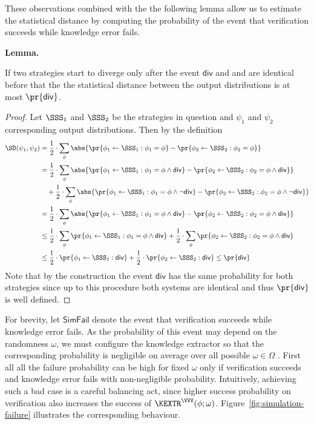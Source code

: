 \documentclass{crypto-exercise}
\newcommand{\SFAIL}{\mathsf{SimFail}}
\begin{document}
\begin{solution}
These observations combined with the the following lemma allow us to estimate the statistical distance by computing the probability of the event that verification succeeds while knowledge error fails. 
 
\vspace*{2ex}
\noindent\textbf{Lemma.}
\begin{it}
If two strategies start to diverge only after the event $\mathsf{div}$ and and are identical before that the the statistical distance between the output distributions is at most $\pr{\mathsf{div}}$.  
\end{it} 
\begin{proof}
Let $\SSS_1$ and $\SSS_2$ be the strategies in question and $\psi_1$ and $\psi_2$ corresponding output distributions. Then by the definition
\begin{align*}
\SD(\psi_1,\psi_2)&=\frac{1}{2}\cdot \sum_{\phi}\abs{\pr{\phi_1\gets\SSS_1: \phi_1=\phi}-\pr{\phi_2\gets\SSS_2: \phi_2=\phi }}\\
&=\frac{1}{2}\cdot \sum_{\phi}\abs{\pr{\phi_1\gets\SSS_1: \phi_1=\phi\wedge \mathsf{div}}-\pr{\phi_2\gets\SSS_2: \phi_2=\phi\wedge \mathsf{div}}}\\
&\quad+\frac{1}{2}\cdot \sum_{\phi}\abs{\pr{\phi_1\gets\SSS_1: \phi_1=\phi\wedge \neg\mathsf{div}}-\pr{\phi_2\gets\SSS_2: \phi_2=\phi\wedge \neg\mathsf{div}}}\\
&=\frac{1}{2}\cdot \sum_{\phi}\abs{\pr{\phi_1\gets\SSS_1: \phi_1=\phi\wedge \mathsf{div}}-\pr{\phi_2\gets\SSS_2: \phi_2=\phi\wedge \mathsf{div}}}\\
&\leq \frac{1}{2}\cdot \sum_{\phi}\pr{\phi_1\gets\SSS_1: \phi_1=\phi\wedge \mathsf{div}}+ \frac{1}{2}\cdot \sum_{\phi}\pr{\phi_2\gets\SSS_2: \phi_2=\phi\wedge \mathsf{div}}\\
&\leq \frac{1}{2}\cdot \pr{\phi_1\gets\SSS_1: \mathsf{div}}+ \frac{1}{2}\cdot \pr{\phi_2\gets\SSS_2: \mathsf{div}}\leq \pr{\mathsf{div}}\enspace
\end{align*} 
Note that by the construction the event $\mathsf{div}$ has the same probability for both strategies since up to this procedure both systems are identical and thus $\pr{\mathsf{div}}$ is well defined.
\end{proof}

For brevity, let  $\SFAIL$ denote the event that verification succeeds while knowledge error fails. As the probability of this event  may depend on the randomness $\omega$, we must configure the knowledge extractor so that the corresponding probability is negligible on average over all possible $\omega\in\Omega$ . First  all all the failure probability can be high for fixed $\omega$ only if verification succeeds and knowledge error fails with non-negligible probability. Intuitively, achieving such a bad case is a careful balancing act, since higher success probability on verification also increases the success of $\KEXTR^{\VVV}(\phi;\omega)$. Figure~\ref{fig:simulation-failure} illustrates the corresponding behaviour.


\end{solution}
\end{document}
